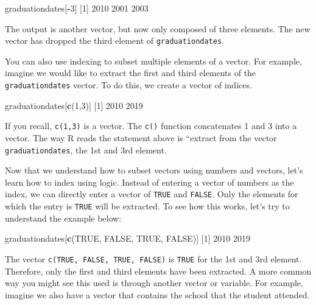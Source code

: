 \documentclass[
]{book}
\newenvironment{Shaded}{\begin{snugshade}}{\end{snugshade}}
\newcommand{\ConstantTok}[1]{\textcolor[rgb]{0.56,0.35,0.01}{#1}}
\newcommand{\DecValTok}[1]{\textcolor[rgb]{0.00,0.00,0.81}{#1}}
\newcommand{\FunctionTok}[1]{\textcolor[rgb]{0.13,0.29,0.53}{\textbf{#1}}}
\newcommand{\NormalTok}[1]{#1}
\newcommand{\SpecialCharTok}[1]{\textcolor[rgb]{0.81,0.36,0.00}{\textbf{#1}}}
\begin{document}
\begin{Shaded}
\begin{Highlighting}[]
\NormalTok{graduationdates[}\SpecialCharTok{{-}}\DecValTok{3}\NormalTok{]}
\NormalTok{[}\DecValTok{1}\NormalTok{] }\DecValTok{2010} \DecValTok{2001} \DecValTok{2003}
\end{Highlighting}
\end{Shaded}

The output is another vector, but now only composed of three elements. The new vector has dropped the third element of \texttt{graduationdates}.

You can also use indexing to subset multiple elements of a vector. For example, imagine we would like to extract the first and third elements of the \texttt{graduationdates} vector. To do this, we create a vector of indices.

\begin{Shaded}
\begin{Highlighting}[]
\NormalTok{graduationdates[}\FunctionTok{c}\NormalTok{(}\DecValTok{1}\NormalTok{,}\DecValTok{3}\NormalTok{)]}
\NormalTok{[}\DecValTok{1}\NormalTok{] }\DecValTok{2010} \DecValTok{2019}
\end{Highlighting}
\end{Shaded}

If you recall, \texttt{c(1,3)} is a vector. The \texttt{c()} function concatenates 1 and 3 into a vector. The way R reads the statement above is ``extract from the vector \texttt{graduationdates}, the 1st and 3rd element.

Now that we understand how to subset vectors using numbers and vectors, let's learn how to index using logic. Instead of entering a vector of numbers as the index, we can directly enter a vector of \texttt{TRUE} and \texttt{FALSE}. Only the elements for which the entry is \texttt{TRUE} will be extracted. To see how this works, let's try to understand the example below:

\begin{Shaded}
\begin{Highlighting}[]
\NormalTok{graduationdates[}\FunctionTok{c}\NormalTok{(}\ConstantTok{TRUE}\NormalTok{, }\ConstantTok{FALSE}\NormalTok{, }\ConstantTok{TRUE}\NormalTok{, }\ConstantTok{FALSE}\NormalTok{)]}
\NormalTok{[}\DecValTok{1}\NormalTok{] }\DecValTok{2010} \DecValTok{2019}
\end{Highlighting}
\end{Shaded}

The vector \texttt{c(TRUE,\ FALSE,\ TRUE,\ FALSE)} is \texttt{TRUE} for the 1st and 3rd element. Therefore, only the first and third elements have been extracted. A more common way you might see this used is through another vector or variable. For example, imagine we also have a vector that contains the school that the student attended.
\end{document}
